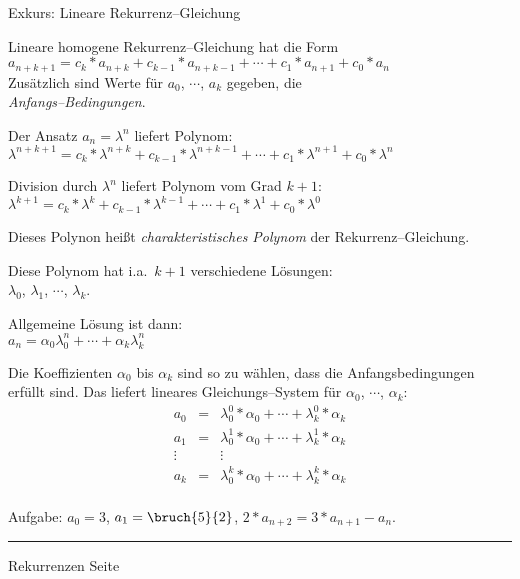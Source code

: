 \begin{slide}{}
\normalsize

\begin{center}
Exkurs: Lineare Rekurrenz--Gleichung
\end{center}
\vspace*{0.5cm}

\footnotesize
Lineare homogene Rekurrenz--Gleichung hat die Form \\[0.3cm]
\hspace*{0.3cm} $a_{n+k+1} = c_k * a_{n+k} + c_{k-1} * a_{n+k-1} + \cdots + c_1 * a_{n+1} + c_0 * a_{n}$ \\[0.3cm]
Zus\"atzlich sind Werte f\"ur $a_0$, $\cdots$, $a_k$ gegeben, die \\
\emph{\sl Anfangs--Bedingungen}.

Der Ansatz $a_n = \lambda^n$ liefert Polynom: \\[0.3cm]
\hspace*{1.3cm} $\lambda^{n+k+1} = c_k * \lambda^{n+k} + c_{k-1} * \lambda^{n+k-1} + \cdots + c_1 * \lambda^{n+1} + c_0 * \lambda^{n}$

Division durch $\lambda^n$ liefert Polynom vom Grad $k+1$: \\[0.3cm]
\hspace*{1.3cm} $\lambda^{k+1} = c_k * \lambda^{k} + c_{k-1} * \lambda^{k-1} + \cdots + c_1 * \lambda^{1} + c_0 * \lambda^{0}$ 

Dieses Polynon hei{\ss}t \emph{charakteristisches Polynom} der Rekurrenz--Gleichung.

Diese Polynom hat i.a.~$k+1$ verschiedene L\"osungen: \\[0.3cm]
\hspace*{1.3cm}  $\lambda_0$, $\lambda_1$, $\cdots$, $\lambda_k$.

Allgemeine L\"osung ist dann: \\[0.3cm]
\hspace*{1.3cm} $a_n = \alpha_0 \lambda_0^n + \cdots + \alpha_k \lambda_k^n$

Die Koeffizienten $\alpha_0$ bis $\alpha_k$ sind so zu w\"ahlen, dass die Anfangsbedingungen 
erf\"ullt sind.  Das liefert lineares Gleichungs--System f\"ur $\alpha_0$, $\cdots$, $\alpha_k$:
$$
\begin{array}{lcl}
  a_0 & = & \lambda_0^0 * \alpha_0 + \cdots +   \lambda_k^0 * \alpha_k \\[0.3cm]
  a_1 & = & \lambda_0^1 * \alpha_0 + \cdots +   \lambda_k^1 * \alpha_k \\[0.3cm]
  \vdots &  & \vdots                                                   \\[0.3cm]
  a_k & = & \lambda_0^k * \alpha_0 + \cdots +   \lambda_k^k * \alpha_k \\[0.3cm]
\end{array}
$$

Aufgabe: $a_0 = 3$, $a_1 = \bruch{5}{2}$, $2 * a_{n+2} = 3 * a_{n+1} - a_n$.
\vspace*{\fill}
\tiny \addtocounter{mypage}{1}
\rule{17cm}{1mm}
Rekurrenzen  \hspace*{\fill} Seite 
\end{slide}

